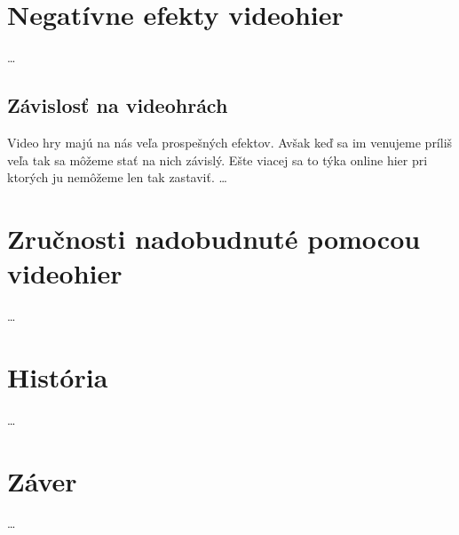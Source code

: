 \documentclass[10pt,oneside,slovak,a4paper]{article}
\begin{document}
\section{Negatívne efekty videohier} \label{ina:neg}
\dots
\subsection{Závislosť na videohrách}

Video hry majú na nás veľa prospešných efektov. Avšak keď sa im venujeme príliš veľa tak sa môžeme stať na nich závislý. Ešte viacej sa to týka online hier pri ktorých ju nemôžeme len tak zastaviť.\cite{addiction} \dots
\section{Zručnosti nadobudnuté pomocou videohier}
\dots
\section{História} \label{History}
\dots


\section{Záver} \label{zaver} %
\dots





\end{document}
